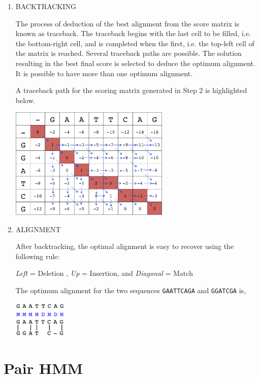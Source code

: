 \documentclass[english, a4paper,11pt]{article}
\begin{document}
\begin{enumerate}
\pagebreak

\item BACKTRACKING

 The process of deduction of the best alignment from the score matrix is known as traceback. 
 The traceback begins with the last cell to be filled, i.e. the bottom-right cell, and is 
 completed when the first, i.e. the top-left cell of the matrix is reached. Several 
 traceback paths are possible. The solution resulting in the best final score is selected 
 to deduce the optimum alignment. It is possible to have more than one optimum alignment. 

A traceback path for the scoring matrix generated in Step 2 is highlighted below.

\begin{center}
\includegraphics[width=0.6\textwidth]{backtracking.png}
\end{center}

\item ALIGNMENT

After backtracking, the optimal alignment is easy to recover using the following rule:

 \emph{Left} = Deletion , \emph{Up} = Insertion, and \emph{Diagonal} = Match 

The optimum alignment for the two sequences \texttt{GAATTCAGA} and \texttt{GGATCGA} is,

\begin{center}
\includegraphics[width=0.2\textwidth]{alignment.png}
\end{center}

\end{enumerate}

\section{Pair HMM}
\end{document}
